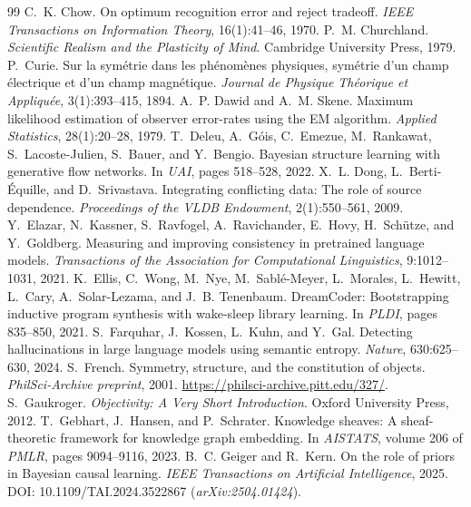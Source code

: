 \documentclass[11pt,a4paper]{article}
\theoremstyle{definition}
\theoremstyle{remark}
\begin{document}
\begin{thebibliography}{99}
 C.~K. Chow. On optimum recognition error and reject tradeoff. \emph{IEEE Transactions on Information Theory}, 16(1):41--46, 1970.
 P.~M. Churchland. \emph{Scientific Realism and the Plasticity of Mind}. Cambridge University Press, 1979.
 P.~Curie. Sur la sym\'etrie dans les ph\'enom\`enes physiques, sym\'etrie d'un champ \'electrique et d'un champ magn\'etique. \emph{Journal de Physique Th\'eorique et Appliqu\'ee}, 3(1):393--415, 1894.
 A.~P. Dawid and A.~M. Skene. Maximum likelihood estimation of observer error-rates using the {EM} algorithm. \emph{Applied Statistics}, 28(1):20--28, 1979.
 T.~Deleu, A.~G\'ois, C.~Emezue, M.~Rankawat, S.~Lacoste-Julien, S.~Bauer, and Y.~Bengio. Bayesian structure learning with generative flow networks. In \emph{UAI}, pages 518--528, 2022.
 X.~L. Dong, L.~Berti-\'Equille, and D.~Srivastava. Integrating conflicting data: The role of source dependence. \emph{Proceedings of the VLDB Endowment}, 2(1):550--561, 2009.
 Y.~Elazar, N.~Kassner, S.~Ravfogel, A.~Ravichander, E.~Hovy, H.~Sch\"utze, and Y.~Goldberg. Measuring and improving consistency in pretrained language models. \emph{Transactions of the Association for Computational Linguistics}, 9:1012--1031, 2021.
 K.~Ellis, C.~Wong, M.~Nye, M.~Sabl\'e-Meyer, L.~Morales, L.~Hewitt, L.~Cary, A.~Solar-Lezama, and J.~B. Tenenbaum. {DreamCoder}: Bootstrapping inductive program synthesis with wake-sleep library learning. In \emph{PLDI}, pages 835--850, 2021.
 S.~Farquhar, J.~Kossen, L.~Kuhn, and Y.~Gal. Detecting hallucinations in large language models using semantic entropy. \emph{Nature}, 630:625--630, 2024.
 S.~French. Symmetry, structure, and the constitution of objects. \emph{PhilSci-Archive preprint}, 2001. \url{https://philsci-archive.pitt.edu/327/}.
 S.~Gaukroger. \emph{Objectivity: A Very Short Introduction}. Oxford University Press, 2012.
 T.~Gebhart, J.~Hansen, and P.~Schrater. Knowledge sheaves: A sheaf-theoretic framework for knowledge graph embedding. In \emph{AISTATS}, volume 206 of \emph{PMLR}, pages 9094--9116, 2023.
 B.~C. Geiger and R.~Kern. On the role of priors in {B}ayesian causal learning. \emph{IEEE Transactions on Artificial Intelligence}, 2025. DOI: 10.1109/TAI.2024.3522867 (\emph{arXiv:2504.01424}).

\end{thebibliography}
\end{document}
